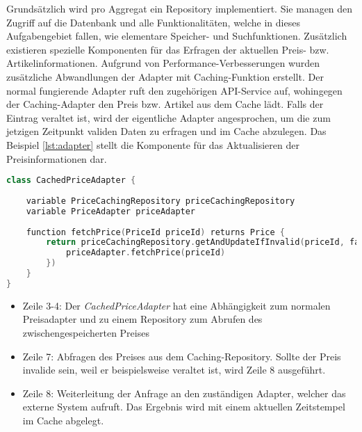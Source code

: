 Grundsätzlich wird pro Aggregat ein Repository implementiert. Sie managen den Zugriff auf die Datenbank und alle Funktionalitäten, welche in dieses Aufgabengebiet fallen, wie elementare Speicher- und Suchfunktionen. Zusätzlich existieren spezielle Komponenten für das Erfragen der aktuellen Preis- bzw. Artikelinformationen. Aufgrund von Performance-Verbesserungen wurden zusätzliche Abwandlungen der Adapter mit Caching-Funktion erstellt. Der normal fungierende Adapter ruft den zugehörigen API-Service auf, wohingegen der Caching-Adapter den Preis bzw. Artikel aus dem Cache lädt. Falls der Eintrag veraltet ist, wird der eigentliche Adapter angesprochen, um die zum jetzigen Zeitpunkt validen Daten zu erfragen und im Cache abzulegen. Das Beispiel \ref{lst:adapter} stellt die Komponente für das Aktualisieren der Preisinformationen dar. 

\vspace{0,5cm}
\begin{minipage}{\linewidth} %
	\begin{lstlisting}[caption={Preisadapter mit Caching-Funktion}, label={lst:adapter}, language=Kotlin]
class CachedPriceAdapter {
	
	variable PriceCachingRepository priceCachingRepository 
	variable PriceAdapter priceAdapter
	
	function fetchPrice(PriceId priceId) returns Price {
		return priceCachingRepository.getAndUpdateIfInvalid(priceId, fallback = {
			priceAdapter.fetchPrice(priceId)
		})
	}
}
	\end{lstlisting}
	\begin{itemize}[noitemsep,nolistsep]
		\item Zeile 3-4: Der \emph{CachedPriceAdapter} hat eine Abhängigkeit zum normalen Preisadapter und zu einem Repository zum Abrufen des zwischengespeicherten Preises
		\item Zeile 7: Abfragen des Preises aus dem Caching-Repository. Sollte der Preis invalide sein, weil er beispielsweise veraltet ist, wird Zeile 8 ausgeführt.
		\item Zeile 8: Weiterleitung der Anfrage an den zuständigen Adapter, welcher das externe System aufruft. Das Ergebnis wird mit einem aktuellen Zeitstempel im Cache abgelegt.
	\end{itemize}
\end{minipage}
